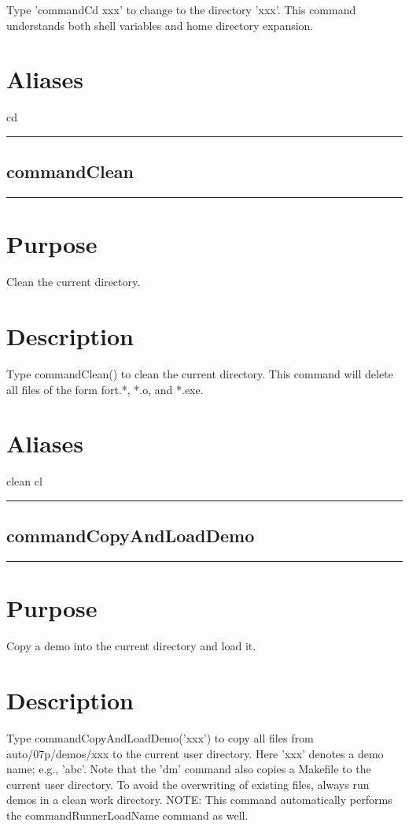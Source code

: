 \documentclass[12pt]{report}
\begin{document}
\begin{minipage}{6in}
    Type 'commandCd xxx' to change to the directory 'xxx'.  This command
    understands both shell variables and home directory expansion.
    \section*{Aliases}
cd \medskip\hrule\end{minipage}\subsection{commandClean} \label{sec:clui_ref_commandClean}\begin{minipage}{6in}\hrule\medskip\section*{Purpose}
Clean the current directory.\section*{Description}

    Type commandClean() to clean the current directory.  This command will
    delete all files of the form fort.*, *.o, and *.exe.
    \section*{Aliases}
clean cl \medskip\hrule\end{minipage}\subsection{commandCopyAndLoadDemo} \label{sec:clui_ref_commandCopyAndLoadDemo}\begin{minipage}{6in}\hrule\medskip\section*{Purpose}
Copy a demo into the current directory and load it.\section*{Description}

    Type commandCopyAndLoadDemo('xxx') to copy all files from auto/07p/demos/xxx to the
    current user directory.  Here 'xxx' denotes a demo name; e.g.,
    'abc'.  Note that the 'dm' command also copies a Makefile to the
    current user directory. To avoid the overwriting of existing
    files, always run demos in a clean work directory.  NOTE: This
    command automatically performs the commandRunnerLoadName command
    as well.

\end{minipage}
\end{document}
